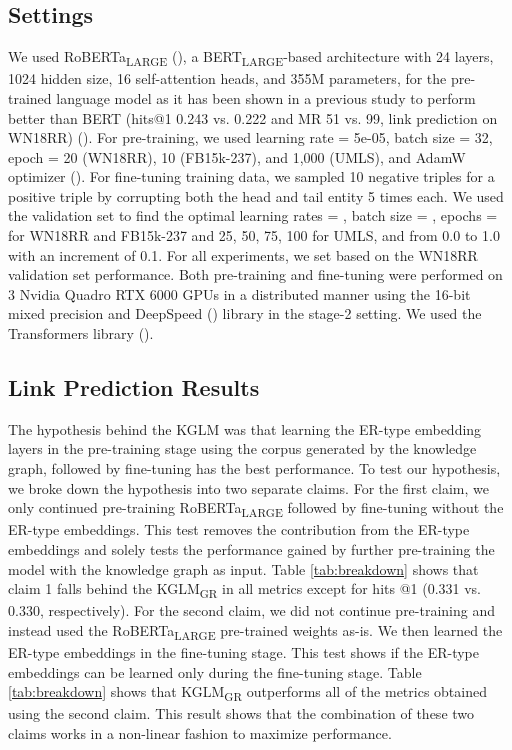 \documentclass[11pt]{article}
\begin{document}
\subsection{Settings}
We used RoBERTa\textsubscript{LARGE} (\citealp{liu2019roberta}), a BERT\textsubscript{LARGE}-based architecture with 24 layers, 1024 hidden size, 16 self-attention heads, and 355M parameters, for the pre-trained language model as it has been shown in a previous study to perform better than BERT (hits@1 0.243 vs. 0.222 and MR 51 vs. 99, link prediction on WN18RR) (\citealp{wang2021structure}). For pre-training, we used learning rate = 5e-05, batch size = 32, epoch = 20 (WN18RR), 10 (FB15k-237), and 1,000 (UMLS), and AdamW optimizer (\citealp{loshchilov2017decoupled}). For fine-tuning training data, we sampled 10 negative triples for a positive triple by corrupting both the head and tail entity 5 times each. We used the validation set to find the optimal learning rates = , batch size = , epochs =  for WN18RR and FB15k-237 and {25, 50, 75, 100} for UMLS, and  from 0.0 to 1.0 with an increment of 0.1. For all experiments, we set  based on the WN18RR validation set performance. Both pre-training and fine-tuning were performed on 3  Nvidia Quadro RTX 6000 GPUs in a distributed manner using the 16-bit mixed precision and DeepSpeed (\citealp{rasley2020deepspeed, rajbhandari2020zero}) library in the stage-2 setting. We used the Transformers library (\citealp{wolf2019huggingface}).


\subsection{Link Prediction Results}
The hypothesis behind the KGLM was that learning the ER-type embedding layers in the pre-training stage using the corpus generated by the knowledge graph, followed by fine-tuning has the best performance. To test our hypothesis, we broke down the hypothesis into two separate claims. For the first claim, we only continued pre-training RoBERTa\textsubscript{LARGE} followed by fine-tuning without the ER-type embeddings. This test removes the contribution from the ER-type embeddings and solely tests the performance gained by further pre-training the model with the knowledge graph as input. Table \ref{tab:breakdown} shows that claim 1 falls behind the KGLM\textsubscript{GR} in all metrics except for hits @1 (0.331 vs. 0.330, respectively). For the second claim, we did not continue pre-training and instead used the RoBERTa\textsubscript{LARGE} pre-trained weights as-is. We then learned the ER-type embeddings in the fine-tuning stage. This test shows if the ER-type embeddings can be learned only during the fine-tuning stage. Table \ref{tab:breakdown} shows that KGLM\textsubscript{GR} outperforms all of the metrics obtained using the second claim. This result shows that the combination of these two claims works in a non-linear fashion to maximize performance.
\end{document}
